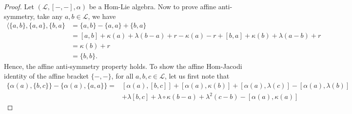 \documentclass[10pt,a4paper]{amsart}
\begin{document}
\begin{proof}
Let $(\mathcal{L},[-,-],\alpha)$ be a Hom-Lie algebra. Now to prove affine anti-symmetry, take any $a,b\in \mathcal{L}$, we have 
\begin{align*}
\langle\{a,b\},\{a,a\},\{b,a\}&=\{a,b\}-\{a,a\}+\{b,a\}\\
&=[a,b]+\kappa(a)+\lambda(b-a)+r-\kappa(a)-r+[b,a]+\kappa(b)+\lambda(a-b)+r\\
&=\kappa(b)+r\\
&=\{b,b\}.
\end{align*}
Hence, the affine anti-symmetry property holds.
To show the affine Hom-Jacodi identity of the affine bracket $\{-,-\}$, for all $a,b,c\in \mathcal{L}$, let us first note that
\begin{align*}
\{\alpha(a),\{b,c\}\}-\{\alpha(a),\{a,a\}\}=&[\alpha(a),[b,c]]+[\alpha(a),\kappa(b)]+[\alpha(a),\lambda(c)]-[\alpha(a),\lambda(b)]\\
&+\lambda[b,c]+\lambda\circ\kappa(b-a)+\lambda^{2}(c-b)-[\alpha(a),\kappa(a)]
\end{align*}



\end{proof}
\end{document}
